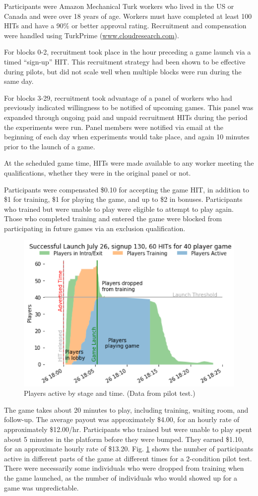\documentclass{article}
\begin{document}
Participants were Amazon Mechanical Turk workers who lived in the US or Canada and were over 18 years of age. Workers must have completed at least 100 HITs and have a 90\% or better approval rating. Recruitment and compensation were handled using TurkPrime (\url{www.cloudresearch.com}).

For blocks 0-2, recruitment took place in the hour preceding a game launch via a timed “sign-up” HIT. This recruitment strategy had been shown to be effective during pilots, but did not scale well when multiple blocks were run during the same day.

For blocks 3-29, recruitment took advantage of a panel of workers who had previously indicated willingness to be notified of upcoming games. This panel was expanded through ongoing paid and unpaid recruitment HITs during the period the experiments were run. Panel members were notified via email at the beginning of each day when experiments would take place, and again 10 minutes prior to the launch of a game. 

At the scheduled game time, HITs were made available to any worker meeting the qualifications, whether they were in the  original panel or not. 

Participants were compensated \$0.10 for accepting the game HIT, in addition to \$1 for training, \$1 for playing the game, and up to \$2 in bonuses. Participants who trained but were unable to play were eligible to attempt to play again. Those who completed training and entered the game were blocked from participating in future games via an exclusion qualification.

\begin{figure}[h!]
\centering
\includegraphics[width=0.6\columnwidth]{recruitment.png}
\caption{Players active by stage and time. (Data from pilot test.)}
\label{fig:recruitment}
\end{figure}

The game takes about 20 minutes to play, including training, waiting room, and follow-up. The average payout was approximately \$4.00, for an hourly rate of approximately \$12.00/hr. Participants who trained but were unable to play spent about 5 minutes in the platform before they were bumped. They earned \$1.10, for an approximate hourly rate of \$13.20.  Fig. \ref{fig:recruitment} shows the number of participants active in different parts of the game at different times for a 2-condition pilot test. There were necessarily some individuals who were dropped from training when the game launched, as the number of individuals who would showed up for a game was unpredictable.
\end{document}
